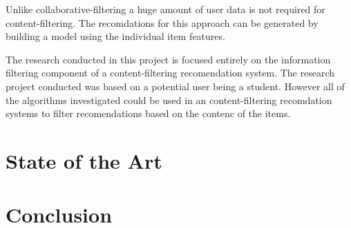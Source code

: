 Unlike collaborative-filtering a huge amount of user data is not required for content-filtering.
The recomdations for this approach can be generated by building a model using the individual item features.

The research conducted in this project is focused entirely on the information filtering component of a content-filtering recomendation system.
The research project conducted was based on a potential user being a student.
However all of the algorithms investigated could be used in an content-filtering recomdation systems to filter recomendations based on the contenc of the items.

\section{State of the Art}

\section{Conclusion}
